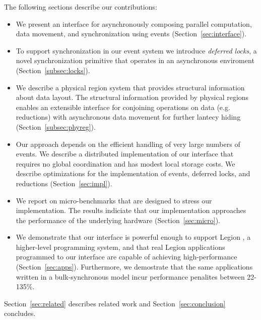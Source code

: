 The following sections describe our contributions:
\begin{itemize} \itemsep1pt \parskip0pt 
\item We present an interface for asynchronously composing
parallel computation, data movement, and synchronization using events (Section~\ref{sec:interface}).  

\item To support synchronization in our event system we introduce {\em deferred locks}, 
a novel synchronization primitive that operates in an asynchronous enviroment (Section~\ref{subsec:locks}).

\item We describe a physical region system that provides structural information about
data layout.  The structural information provided by physical regions enables an extensible
interface for conjoining operations on data (e.g. reductions) with asynchronous data movement for 
further lantecy hiding (Section~\ref{subsec:phyreg}).

\item Our approach depends on the efficient handling of very large numbers of events.
We describe a distributed implementation of our interface that requires no global coordination
and has modest local storage costs.  We describe optimizations for the implementation of events, 
deferred locks, and reductions (Section~\ref{sec:impl}).

\item We report on micro-benchmarks that are designed to stress
our implementation.  The results indiciate that our implementation approaches the performance of
the underlying hardware (Section~\ref{sec:micro}).

\item We demonstrate that our interface is powerful enough to support Legion \cite{Legion12}, a higher-level
programming system, and that real Legion applications programmed to our interface
are capable of achieving high-performance (Section~\ref{sec:apps}).  Furthermore, we demostrate
that the same applications written in a bulk-synchronous model incur performance penalites between 22-135\%.
\end{itemize}

Section~\ref{sec:related} describes related work and Section~\ref{sec:conclusion}
concludes.

